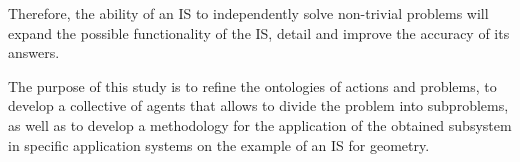 \documentclass[10pt, a4paper]{article}
\begin{document}
\begin{multicols}{2}
\begin{itemize}
    \end{itemize}
    \par Therefore, the ability of an IS to independently solve non-trivial problems will expand the possible functionality of the IS, detail and improve the accuracy of its answers.
    \par The purpose of this study is to refine the ontologies of actions and problems, to develop a collective of agents that allows to divide the problem into subproblems, as well as to develop a methodology for the application of the obtained subsystem in specific application systems on the example of an IS for geometry.
\end{multicols}
\end{document}

